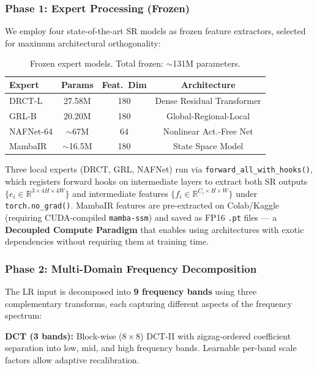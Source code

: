\documentclass[10pt,twocolumn,letterpaper]{article}
\begin{document}
\subsubsection{Phase 1: Expert Processing (Frozen)}

We employ four state-of-the-art SR models as frozen feature extractors, selected for maximum architectural orthogonality:

\begin{table}[h]
\centering
\small
\begin{tabular}{@{}lccc@{}}
\toprule
\textbf{Expert} & \textbf{Params} & \textbf{Feat.\ Dim} & \textbf{Architecture} \\
\midrule
DRCT-L \cite{drct} & 27.58M & 180 & Dense Residual Transformer \\
GRL-B \cite{grl} & 20.20M & 180 & Global-Regional-Local \\
NAFNet-64 \cite{nafnet} & $\sim$67M & 64 & Nonlinear Act.-Free Net \\
MambaIR \cite{mambair} & $\sim$16.5M & 180 & State Space Model \\
\bottomrule
\end{tabular}
\caption{Frozen expert models. Total frozen: $\sim$131M parameters.}
\label{tab:experts}
\end{table}

Three local experts (DRCT, GRL, NAFNet) run via \texttt{forward\_all\_with\_hooks()}, which registers forward hooks on intermediate layers to extract both SR outputs $\{e_i \in \mathbb{R}^{3 \times 4H \times 4W}\}$ and intermediate features $\{f_i \in \mathbb{R}^{C_i \times H \times W}\}$ under \texttt{torch.no\_grad()}. MambaIR features are pre-extracted on Colab/Kaggle (requiring CUDA-compiled \texttt{mamba-ssm}) and saved as FP16 \texttt{.pt} files --- a \textbf{Decoupled Compute Paradigm} that enables using architectures with exotic dependencies without requiring them at training time.

\subsubsection{Phase 2: Multi-Domain Frequency Decomposition}

The LR input is decomposed into \textbf{9 frequency bands} using three complementary transforms, each capturing different aspects of the frequency spectrum:

\noindent\textbf{DCT (3 bands):} Block-wise ($8\times 8$) DCT-II with zigzag-ordered coefficient separation into low, mid, and high frequency bands. Learnable per-band scale factors allow adaptive recalibration.
\end{document}
